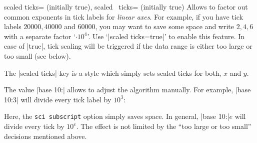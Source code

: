 \begin{pgfplotsxykeylist}{%
    scaled ticks= (initially true),
    scaled \x\ ticks= (initially true)%
}
    Allows to factor out common exponents in tick labels for \emph{linear
    axes}. For example, if you have tick labels $20000,40000$ and $60000$, you
    may want to save some space and write $2,4,6$ with a separate factor
    `$\cdot 10^4$'. Use `|scaled ticks=true|' to enable this feature. In case
    of |true|, tick scaling will be triggered if the data range is either too
    large or too small (see below).
\begin{codeexample}[]
%
\end{codeexample}

\begin{codeexample}[]
\end{codeexample}

    The |scaled ticks| key is a style which simply sets scaled ticks for both,
    $x$ and $y$.

    The value |base 10:| allows to adjust the algorithm manually. For
    example, |base 10:3| will divide every tick label by $10^3$:
\begin{codeexample}[]
\end{codeexample}
    \noindent Here, the \texttt{sci subscript} option simply saves space. In
    general, |base 10:|$e$ will divide every tick by $10^e$. The effect is not
    limited by the ``too large or too small'' decisions mentioned above.


\end{pgfplotsxykeylist}

